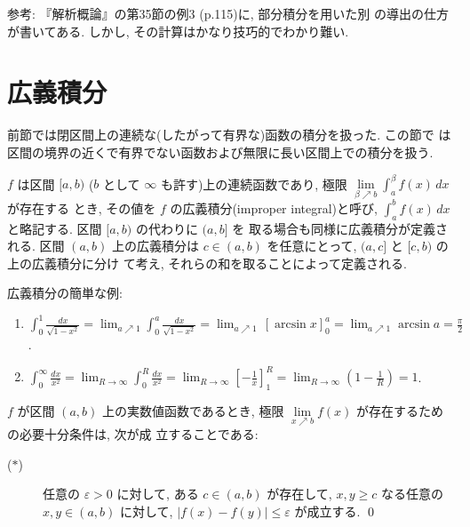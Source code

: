 \documentclass[12pt,twoside]{jarticle}
\begin{document}
\noindent 参考: 『解析概論』の第35節の例3 (p.115)に, 部分積分を用いた別
の導出の仕方が書いてある. しかし, その計算はかなり技巧的でわかり難い.


\section{広義積分}

前節では閉区間上の連続な(したがって有界な)函数の積分を扱った. この節で
は区間の境界の近くで有界でない函数および無限に長い区間上での積分を扱う.

\begin{Definition}
  $f$ は区間 $[a,b)$ ($b$ として $\infty$ も許す)上の連続函数であり, 
  極限 $\lim\limits_{\beta\nearrow b}\int_a^\beta f(x)\,dx$ が存在する
  とき, その値を $f$ の広義積分(improper integral)と呼び, %
  $\int_a^b f(x)\,dx$ と略記する.  区間 $[a,b)$ の代わりに $(a,b]$ を
  取る場合も同様に広義積分が定義される. 区間 $(a,b)$ 上の広義積分は %
  $c\in(a,b)$ を任意にとって, $(a,c]$ と $[c,b)$ の上の広義積分に分け
  て考え, それらの和を取ることによって定義される.
\end{Definition}

\begin{Example}
  広義積分の簡単な例:
  \begin{enumerate}
  \item \( \displaystyle
    \int_0^1 \frac{dx}{\sqrt{1-x^2}}
    = \lim_{a\nearrow1} \int_0^a \frac{dx}{\sqrt{1-x^2}}
    = \lim_{a\nearrow1}\, \left[ \arcsin x \right]_0^a
    = \lim_{a\nearrow1} \arcsin a
    = \frac{\pi}{2}
    \).
  \item \( \displaystyle
    \int_0^\infty \frac{dx}{x^2}
    = \lim_{R\to\infty} \int_0^R \frac{dx}{x^2}
    = \lim_{R\to\infty} \left[ -\frac{1}{x} \right]_1^R
    = \lim_{R\to\infty} \left( 1 - \frac{1}{R} \right)
    = 1
    \).
  \end{enumerate}
\end{Example}

\begin{question}[Cauchyの収束判定法の連続変数版]
  $f$ が区間 $(a,b)$ 上の実数値函数であるとき, 極限 %
  $\lim\limits_{x\nearrow b} f(x)$ が存在するための必要十分条件は, 次が成
  立することである:
  \begin{description}
  \item[($\ast$)] 任意の $\varepsilon > 0$ に対して, %
    ある $c\in(a,b)$ が存在して, $x,y \ge c$ なる任意の $x,y \in (a,b)$%
    に対して, $|f(x) - f(y)| \le \varepsilon$ が成立する.
    \qed
  \end{description}
\end{question}
\end{document}
